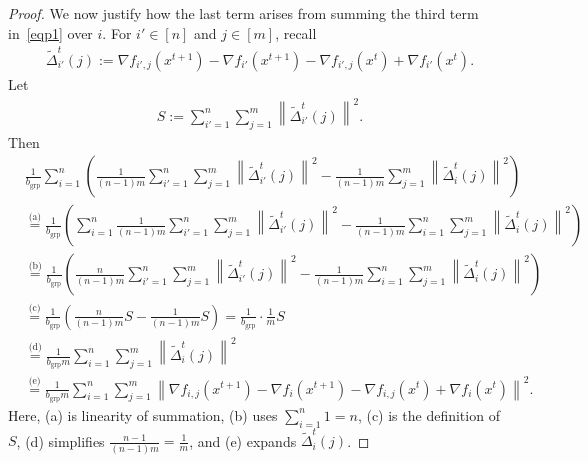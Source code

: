 \documentclass{article}
\newcommand{\eqtext}[1]{\ensuremath{\stackrel{\text{#1}}{=}}}
\newcommand{\sqn}[1]{\left\| #1 \right\|^2}
\newcommand{\eqdef}{:=}
\theoremstyle{plain}
\begin{document}
\begin{proof}
We now justify how the last term arises from summing the third term in~\eqref{eqp1} over $i$.
For $i'\in[n]$ and $j\in[m]$, recall
\begin{align*}
\widetilde{\Delta}_{i'}^t(j)\eqdef \nabla f_{i',j}(x^{t+1})-\nabla f_{i'}(x^{t+1})-\nabla f_{i',j}(x^{t})+\nabla f_{i'}(x^{t}).
\end{align*}
Let
\begin{align*}
S \eqdef \sum_{i'=1}^n\sum_{j=1}^m \sqn{\widetilde{\Delta}_{i'}^t(j)}.
\end{align*}
Then
\begin{align*}
&\frac{1}{b_{\mathrm{grp}}}\sum_{i=1}^n \left(
\frac{1}{(n-1)m}\sum_{i'=1}^n\sum_{j=1}^m \sqn{\widetilde{\Delta}_{i'}^t(j)}
-\frac{1}{(n-1)m}\sum_{j=1}^m \sqn{\widetilde{\Delta}_{i}^t(j)}
\right)\\
&\eqtext{(a)}
\frac{1}{b_{\mathrm{grp}}}\left(
\sum_{i=1}^n \frac{1}{(n-1)m}\sum_{i'=1}^n\sum_{j=1}^m \sqn{\widetilde{\Delta}_{i'}^t(j)}
-\frac{1}{(n-1)m}\sum_{i=1}^n\sum_{j=1}^m \sqn{\widetilde{\Delta}_{i}^t(j)}
\right)\\
&\eqtext{(b)}
\frac{1}{b_{\mathrm{grp}}}\left(
\frac{n}{(n-1)m}\sum_{i'=1}^n\sum_{j=1}^m \sqn{\widetilde{\Delta}_{i'}^t(j)}
-\frac{1}{(n-1)m}\sum_{i=1}^n\sum_{j=1}^m \sqn{\widetilde{\Delta}_{i}^t(j)}
\right)\\
&\eqtext{(c)}
\frac{1}{b_{\mathrm{grp}}}\left(\frac{n}{(n-1)m}S-\frac{1}{(n-1)m}S\right)
=\frac{1}{b_{\mathrm{grp}}}\cdot \frac{1}{m}S\\
&\eqtext{(d)}
\frac{1}{b_{\mathrm{grp}}m}\sum_{i=1}^n\sum_{j=1}^m \sqn{\widetilde{\Delta}_{i}^t(j)}\\
&\eqtext{(e)}
\frac{1}{b_{\mathrm{grp}}m}\sum_{i=1}^n\sum_{j=1}^m
\sqn{\nabla f_{i,j}(x^{t+1})- \nabla f_{i}(x^{t+1})-\nabla f_{i,j}(x^{t})+\nabla f_{i}(x^{t})}.
\end{align*}
Here, (a) is linearity of summation, (b) uses $\sum_{i=1}^n 1=n$, (c) is the definition of $S$,
(d) simplifies $\frac{n-1}{(n-1)m}=\frac{1}{m}$, and (e) expands $\widetilde{\Delta}_i^t(j)$.


\end{proof}
\end{document}
